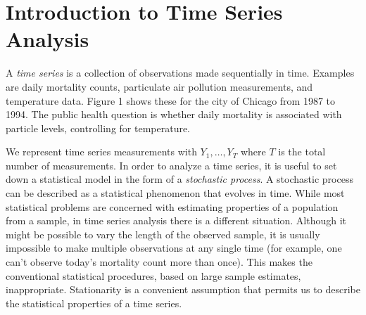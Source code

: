 \chapter{Introduction to Time Series Analysis}
A {\sl time series} is a collection of observations made
sequentially in time. Examples are daily mortality counts,
particulate air pollution measurements, and temperature data.
Figure 1 shows these for the city of Chicago from 1987 to 1994.
The public health question is whether daily mortality is
associated with particle levels, controlling for temperature.

\centerline{}

We represent time series measurements with $Y_1, \dots, Y_T$
where $T$ is the total number of measurements. In order to analyze
a time series, it is useful to set down a statistical model in the
form of a {\sl stochastic process}. A stochastic process can be
described as a statistical phenomenon
that evolves in time. While most statistical problems are
concerned with estimating properties of a population from a
sample, in time series analysis there is a different situation.
Although it might be possible to vary the length of the observed
sample, it is usually impossible to make multiple observations at
any single time (for example, one can't observe today's mortality
count more than once). This makes the conventional statistical
procedures, based on large sample estimates, inappropriate.
Stationarity is a convenient assumption that permits us to
describe the statistical properties of a time series.



